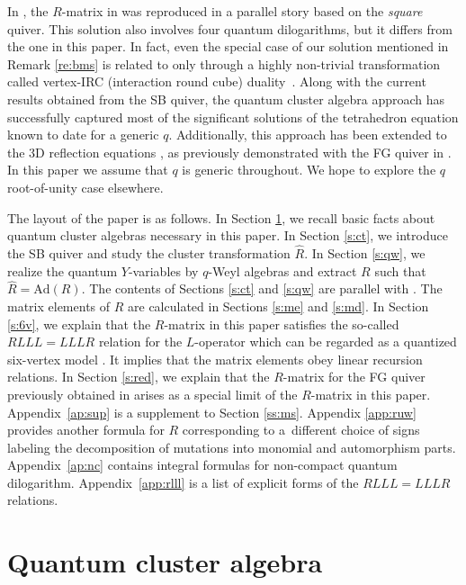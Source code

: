 \documentclass[pdftex]{sigma}
\numberwithin{equation}{section}
\begin{document}
In \cite{IKT2}, the $R$-matrix in \cite{S99} was reproduced in a
parallel story based on the {\em square} quiver. This solution also
involves four quantum dilogarithms, but it differs from the one in
this paper. In fact, even the special case of our solution mentioned
in Remark \ref{re:bms} is related to \cite{S99} only through a highly
non-trivial transformation called vertex-IRC (interaction round cube)
duality~\cite{S10}. Along with the current results obtained from the
SB quiver, the quantum cluster algebra approach has successfully
captured most of the significant solutions of the tetrahedron equation
known to date for a generic $q$. Additionally, this approach has been
extended to the 3D reflection equations \cite{IK97,K22}, as previously
demonstrated with the FG quiver in \cite{IKT1}. In this paper we
assume that $q$ is generic throughout. We hope to explore the $q$
root-of-unity case elsewhere.

The layout of the paper is as follows. In Section \ref{s:qca}, we
recall basic facts about quantum cluster algebras necessary in this
paper. In Section \ref{s:ct}, we introduce the SB quiver and study the
cluster transformation $\hat{R}$. In Section \ref{s:qw}, we realize
the quantum $Y$-variables by $q$-Weyl algebras and extract $R$ such
that $\hat{R}=\mathrm{Ad}(R)$. The contents of Sections \ref{s:ct}
and \ref{s:qw} are parallel with \cite{IKT2}. The matrix elements of
$R$ are calculated in Sections \ref{s:me} and \ref{s:md}. In Section
\ref{s:6v}, we explain that the $R$-matrix in this paper satisfies the
so-called $RLLL=LLLR$ relation for the $L$-operator which can be
regarded as a quantized six-vertex model \cite{BMS10,KMY23}. It
implies that the matrix elements obey linear recursion relations. In
Section \ref{s:red}, we explain that the $R$-matrix for the FG quiver
previously obtained in \cite{IKT1} arises as a special limit of the
$R$-matrix in this paper. Appendix~\ref{ap:sup} is a supplement to
Section \ref{ss:ms}. Appendix \ref{app:ruw} provides another formula
for $R$ corresponding to a~different choice of signs labeling the
decomposition of mutations into monomial and automorphism parts.
Appendix~\ref{ap:nc} contains integral formulas for non-compact
quantum dilogarithm. Appendix~\ref{app:rlll} is a list of explicit
forms of the $RLLL=LLLR$ relations.


\section{Quantum cluster algebra}\label{s:qca}
\end{document}
